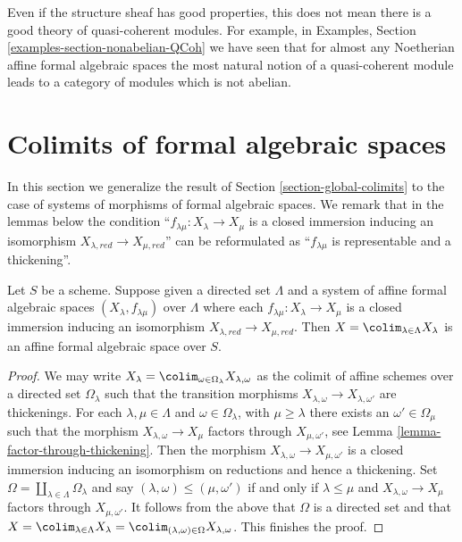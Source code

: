 \begin{remark}
\label{remark-bad-quasi-coherent}
Even if the structure sheaf has good properties, this does not
mean there is a good theory of quasi-coherent modules. For example,
in Examples, Section \ref{examples-section-nonabelian-QCoh}
we have seen that for almost any Noetherian affine formal algebraic spaces
the most natural notion of a quasi-coherent module leads to a
category of modules which is not abelian.
\end{remark}





\section{Colimits of formal algebraic spaces}
\label{section-colimits-of-formal}

\noindent
In this section we generalize the result of
Section \ref{section-global-colimits}
to the case of systems of morphisms of formal algebraic spaces.
We remark that in the lemmas below the condition
``$f_{\lambda \mu} : X_\lambda \to X_\mu$ is a closed immersion
inducing an isomorphism $X_{\lambda, red} \to X_{\mu, red}$''
can be reformulated as
``$f_{\lambda \mu}$ is representable and a thickening''.

\begin{lemma}
\label{lemma-colimit-affine-formal}
Let $S$ be a scheme. Suppose given a directed set
$\Lambda$ and a system of affine formal algebraic spaces
$(X_\lambda, f_{\lambda \mu})$ over $\Lambda$ where each
$f_{\lambda \mu} : X_\lambda \to X_\mu$ is a closed immersion
inducing an isomorphism $X_{\lambda, red} \to X_{\mu, red}$.
Then $X = \colim_{\lambda \in \Lambda} X_\lambda$
is an affine formal algebraic space over $S$.
\end{lemma}

\begin{proof}
We may write
$X_\lambda = \colim_{\omega \in \Omega_\lambda} X_{\lambda, \omega}$
as the colimit of affine schemes over a directed set
$\Omega_\lambda$ such that the transition morphisms
$X_{\lambda, \omega} \to X_{\lambda, \omega'}$
are thickenings. For each $\lambda, \mu \in \Lambda$
and $\omega \in \Omega_\lambda$, with $\mu \geq \lambda$
there exists an $\omega' \in \Omega_\mu$ such that the morphism
$X_{\lambda, \omega} \to X_\mu$ factors through $X_{\mu, \omega'}$, see
Lemma \ref{lemma-factor-through-thickening}. Then
the morphism $X_{\lambda, \omega} \to X_{\mu, \omega'}$
is a closed immersion inducing an isomorphism on reductions
and hence a thickening. Set
$\Omega = \coprod_{\lambda \in \Lambda} \Omega_\lambda$
and say $(\lambda, \omega) \leq (\mu, \omega')$ if and only if
$\lambda \leq \mu$ and $X_{\lambda, \omega} \to X_\mu$ factors through
$X_{\mu, \omega'}$. It follows from the above that
$\Omega$ is a directed set and that
$X = \colim_{\lambda \in \Lambda} X_\lambda =
\colim_{(\lambda, \omega) \in \Omega} X_{\lambda, \omega}$.
This finishes the proof.
\end{proof}


